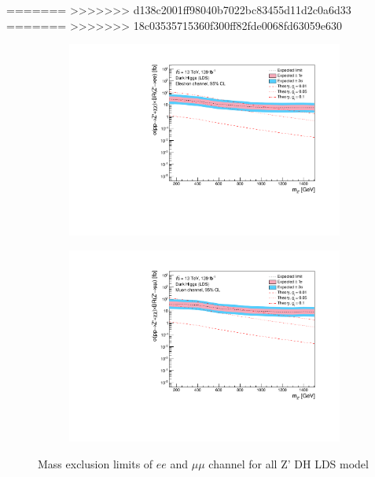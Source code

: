 \documentclass[12pt, a4paper]{book}
\begin{document}
=======
>>>>>>> d138c2001ff98040b7022bc83455d11d2c0a6d33
=======
>>>>>>> 18c03535715360f300ff82fde0068fd63059e630
\begin{figure}[!ht]
	\centering
   \begin{subfigure}[b]{0.49\textwidth}
      \centering
      \includegraphics[width=1\textwidth]{Limits/DH_LDS/mass_exclusion_ee.pdf}
      \end{subfigure}
   \hfill
   \begin{subfigure}[b]{0.49\textwidth}
      \centering
      \includegraphics[width=1\textwidth]{Limits/DH_LDS/mass_exclusion_uu.pdf}
      \end{subfigure}
   \caption{Mass exclusion limits of $ee$ and $\mu\mu$ channel for all Z' DH LDS model}\label{fig:DH_LDS_exclusion_ee_uu}
\end{figure}
\clearpage
\end{document}
